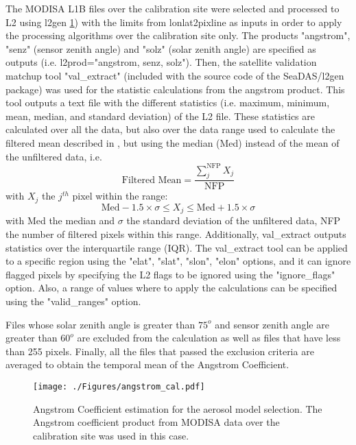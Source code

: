\documentclass[]{interact}
\theoremstyle{plain}%
\theoremstyle{definition}
\theoremstyle{remark}
\begin{document}
The MODISA L1B files over the calibration site were selected and processed to L2 using l2gen \ref{fig:angstrom_cal}) with the limits from lonlat2pixline as inputs in order to apply the processing algorithms over the calibration site only. The products "angstrom", "senz" (sensor zenith angle) and "solz" (solar zenith angle) are specified as outputs (i.e. l2prod="angstrom, senz, solz"). Then, the satellite validation matchup tool "val\_extract" (included with the source code of the SeaDAS/l2gen package) was used for the statistic calculations from the angstrom product. This tool outputs a text file with the different statistics (i.e. maximum, minimum, mean, median, and standard deviation) of the L2 file. These statistics are calculated over all the data, but also over the data range used to calculate the filtered mean described in \cite{Bailey2006}, but using the median (Med) instead of the mean of the unfiltered data, i.e.
\begin{equation}
  \text{Filtered Mean}=\frac{\displaystyle \sum_j^{\text{NFP}}X_j}{\text{NFP}}
\end{equation}
with $X_j$ the $j^{th}$ pixel within the range:
\begin{equation}
  \text{Med}-1.5\times\sigma\leq X_j\leq \text{Med}+1.5\times\sigma
\end{equation}
with Med the median and $\sigma$ the standard deviation of the unfiltered data, NFP the number of filtered pixels within this range. Additionally, val\_extract outputs statistics over the interquartile range (IQR). The val\_extract tool can be applied to a specific region using the "elat", "slat", "slon", "elon" options, and it can ignore flagged pixels by specifying the L2 flags to be ignored using the "ignore\_flags" option. Also, a range of values where to apply the calculations can be specified using the "valid\_ranges" option. 

Files whose solar zenith angle is greater than $75^o$ and sensor zenith angle are greater than $60^o$ are excluded from the calculation as well as files that have less than 255 pixels. Finally, all the files that passed the exclusion criteria are averaged to obtain the temporal mean of the Angstrom Coefficient. 
\begin{figure}[H]
  \centering
  \texttt{[image: ./Figures/angstrom\_cal.pdf]}
    \caption{Angstrom Coefficient estimation for the aerosol model selection. The Angstrom coefficient product from MODISA data over the calibration site was used in this case.  \label{fig:angstrom_cal}} 
\end{figure}
\end{document}
